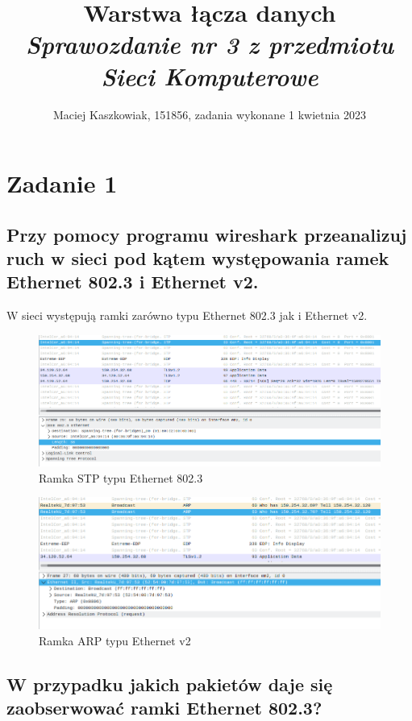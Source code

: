 \documentclass[polish, a4paper]{article}
\title{Warstwa łącza danych \\
        \Large \emph{Sprawozdanie nr 3 z przedmiotu Sieci Komputerowe}}
\author{Maciej Kaszkowiak, 151856, zadania wykonane 1 kwietnia 2023}
\date{\vspace{-5ex}} %
\begin{document}
\maketitle

\tableofcontents

\newpage

\section{Zadanie 1}
\subsection{Przy pomocy programu wireshark przeanalizuj ruch w sieci
pod kątem występowania ramek Ethernet 802.3 i Ethernet v2.}

W sieci występują ramki zarówno typu Ethernet 802.3 jak i Ethernet v2.

\begin{figure}[H]
\centering
\includegraphics[width=\textwidth]{ieee8023.png}
\caption{Ramka STP typu Ethernet 802.3}
\end{figure}

\begin{figure}[H]
\centering
\includegraphics[width=\textwidth]{ethernetv2.png}
\caption{Ramka ARP typu Ethernet v2}
\end{figure}

\subsection{W przypadku jakich pakietów daje się zaobserwować ramki
Ethernet 802.3?}
\end{document}
